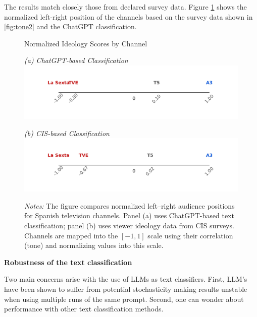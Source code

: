 \documentclass[12pt]{article}
\begin{document}
	The results match closely those from declared survey data. 	Figure \ref{fig:channel_ideology_lines} shows the normalized left-right position of the channels based on the survey data shown in \ref{fig:tone2} and the ChatGPT classification. 
	
	
		\begin{figure}[ht]
		\centering
		\caption{Normalized Ideology Scores by Channel}
		\begin{minipage}[t]{0.48\textwidth}
			\centering
			\textit{(a) ChatGPT-based Classification}
			\includegraphics[width=\linewidth]{figures/congress_line_chatgpt}
			
		\end{minipage}
		\hfill
		\begin{minipage}[t]{0.48\textwidth}
			\centering
			\textit{(b) CIS-based Classification}
			\includegraphics[width=\linewidth]{figures/congress_line_cis}
			
		\end{minipage}
		
		
		\caption*{\small \textit{Notes:} The figure compares normalized left–right audience positions for Spanish television channels. Panel (a) uses ChatGPT-based text classification; panel (b) uses viewer ideology data from CIS surveys. Channels are mapped into the $[-1,1]$ scale using their correlation (tone) and normalizing values into this scale. }
		\label{fig:channel_ideology_lines}
	\end{figure}
	
	
	\textbf{Robustness of  the text classification}
	
	Two main concerns arise with the use of LLMs as text classifiers. First, LLM's have been shown to suffer from potential stochasticity making results unstable when using multiple runs of the same prompt.  Second, one can wonder about performance with other text classification methods.
	
\end{document}
